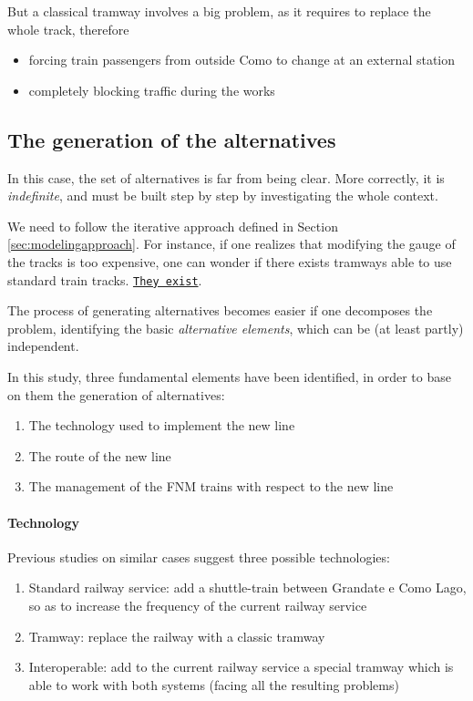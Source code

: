 But a classical tramway involves a big problem, as it requires to replace the whole track, therefore 
\begin{itemize}
	\item forcing train passengers from outside Como to change at an external station
	
	\item completely blocking traffic during the works
\end{itemize}

\subsection{The generation of the alternatives}
\label{sec:comoalternatives}

In this case, the set of alternatives is far from being clear. More correctly, it is \textit{indefinite}, and must be built step by step by investigating the whole context. 

We need to follow the iterative approach defined in Section \ref{sec:modelingapproach}. For instance, if one realizes that modifying the gauge of the tracks is too expensive, one can wonder if there exists tramways able to use standard train tracks. \href{https://it.wikipedia.org/wiki/Tram-treno}{\texttt{They exist}}.

The process of generating alternatives becomes easier if one decomposes the problem, identifying the basic \textit{alternative elements}, which can be (at least partly) independent.

In this study, three fundamental elements have been identified, in order to base on them the generation of alternatives: 
\begin{enumerate}
	\item The technology used to implement the new line 
	
	\item The route of the new line
	
	\item The management of the FNM trains with respect to the new line
\end{enumerate}

\paragraph{Technology} Previous studies on similar cases suggest three possible technologies:
\begin{enumerate}
	\item Standard railway service: add a shuttle-train between Grandate e Como Lago, so as to increase the frequency of the current railway service
	
	\item Tramway: replace the railway with a classic tramway
	
	\item Interoperable: add to the current railway service a special tramway which is able to work with both systems (facing all the resulting problems)
\end{enumerate}

